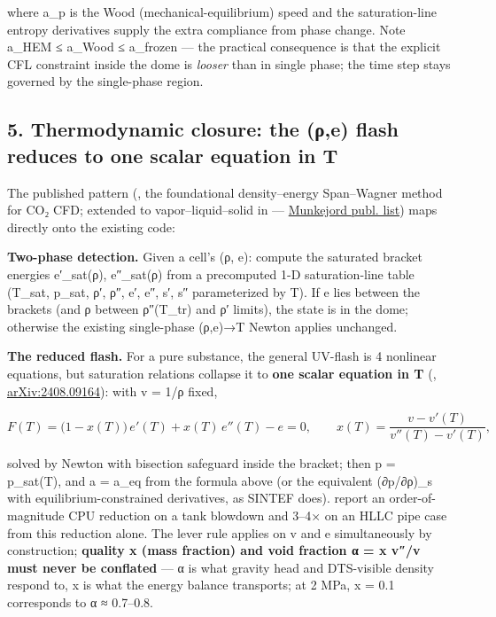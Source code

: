 where a\_p is the Wood (mechanical-equilibrium) speed and the
saturation-line entropy derivatives supply the extra compliance from
phase change. Note a\_HEM ≤ a\_Wood ≤ a\_frozen --- the practical
consequence is that the explicit CFL constraint inside the dome is
\emph{looser} than in single phase; the time step stays governed by the
single-phase region.

\hypertarget{thermodynamic-closure-the-ux3c1e-flash-reduces-to-one-scalar-equation-in-t}{%
\subsection{5. Thermodynamic closure: the (ρ,e) flash reduces to one
scalar equation in
T}\label{thermodynamic-closure-the-ux3c1e-flash-reduces-to-one-scalar-equation-in-t}}

The published pattern (\citealp{giljarhus2012}, the foundational density--energy Span--Wagner method for CO₂ CFD; extended to vapor--liquid--solid in \citealp{hammer2013} ---
\href{https://pvv.ntnu.no/~stm/dring/publ.html}{Munkejord publ. list})
maps directly onto the existing code:

\textbf{Two-phase detection.} Given a cell's (ρ, e): compute the
saturated bracket energies e′\_sat(ρ), e″\_sat(ρ) from a precomputed 1-D
saturation-line table (T\_sat, p\_sat, ρ′, ρ″, e′, e″, s′, s″
parameterized by T). If e lies between the brackets (and ρ between
ρ″(T\_tr) and ρ′ limits), the state is in the dome; otherwise the
existing single-phase (ρ,e)→T Newton applies unchanged.

\textbf{The reduced flash.} For a pure substance, the general UV-flash
is 4 nonlinear equations, but saturation relations collapse it to
\textbf{one scalar equation in T}
(\citealp{kumar2024}, \href{https://arxiv.org/html/2408.09164v2}{arXiv:2408.09164}): with v = 1/ρ fixed,

\[F(T) = \big(1 - x(T)\big)\,e'(T) + x(T)\,e''(T) - e = 0, \qquad x(T) = \frac{v - v'(T)}{v''(T) - v'(T)},\]

solved by Newton with bisection safeguard inside the bracket; then p =
p\_sat(T), and a = a\_eq from the formula above (or the equivalent
(∂p/∂ρ)\_s with equilibrium-constrained derivatives, as SINTEF does).
\citet{kumar2024} report an order-of-magnitude CPU reduction on a tank
blowdown and 3--4× on an HLLC pipe case from this reduction alone. The
lever rule applies on v and e simultaneously by construction;
\textbf{quality x (mass fraction) and void fraction α = x v″/v must
never be conflated} --- α is what gravity head and DTS-visible density
respond to, x is what the energy balance transports; at 2 MPa, x = 0.1
corresponds to α ≈ 0.7--0.8.

